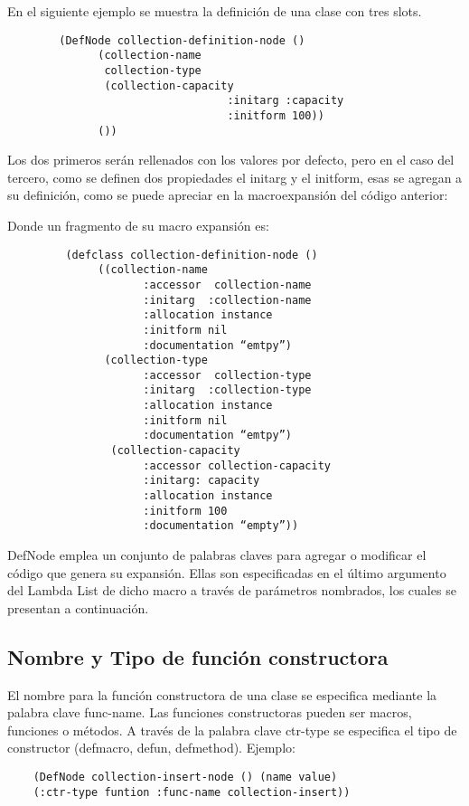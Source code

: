 En el siguiente ejemplo se muestra la definición de una clase con tres slots. 
\begin{verbatim}
        (DefNode collection-definition-node () 
	  	      (collection-name
               collection-type 
	  	       (collection-capacity 
	  	                          :initarg :capacity 
	  	                          :initform 100))
              ())
\end{verbatim}

Los dos primeros serán rellenados con los valores por defecto, pero en el caso del tercero, como se definen dos propiedades el initarg y el initform, esas se agregan a su definición, como se puede apreciar en la macroexpansión del código anterior:

Donde un fragmento de su macro expansión es:
\begin{verbatim}
	     (defclass collection-definition-node () 
	          ((collection-name 
	                 :accessor  collection-name
	                 :initarg  :collection-name 
	                 :allocation instance 
	                 :initform nil 
	                 :documentation “emtpy”)
	           (collection-type 
	                 :accessor  collection-type
	                 :initarg  :collection-type 
	                 :allocation instance 
	                 :initform nil 
	                 :documentation “emtpy”)
	            (collection-capacity 
	                 :accessor collection-capacity
	                 :initarg: capacity
                     :allocation instance
	                 :initform 100
	                 :documentation “empty”))
\end{verbatim}

DefNode emplea un conjunto de palabras claves para agregar o modificar el código que genera su expansión. Ellas son especificadas en el último argumento del Lambda List de dicho macro a través de parámetros nombrados, los cuales se presentan a continuación.

\subsection{Nombre y Tipo de función constructora}
El nombre para la función constructora de una clase se especifica mediante la palabra clave func-name. Las funciones constructoras pueden ser macros, funciones o métodos. A través de la palabra clave ctr-type se especifica el tipo de constructor (defmacro, defun, defmethod).
Ejemplo:
\begin{verbatim}
	(DefNode collection-insert-node () (name value) 
	(:ctr-type funtion :func-name collection-insert))
\end{verbatim}

